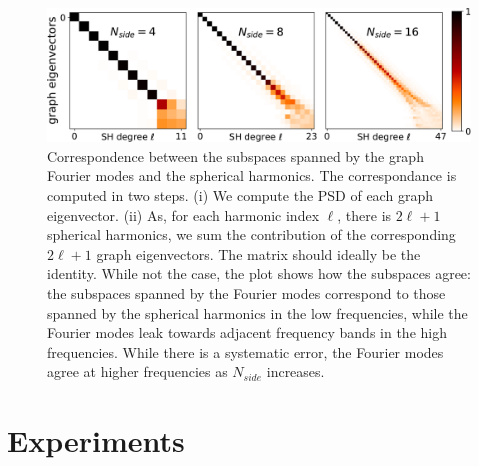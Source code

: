 \documentclass{article} %
\newcommand{\figref}[1]{Figure~\ref{fig:#1}}
\renewcommand{\b}[1]{{\bm{#1}}}   %
\newcommand{\1}{\b{1}}              %
\newcommand{\0}{\b{0}}              %
\newcommand{\todo}[1]{{\color[rgb]{.6,.1,.6}{#1}}}
\begin{document}
\begin{figure}[ht!]
	\centering
	\includegraphics[width=0.9\linewidth]{subspace_harmonics_eigenvectors_v2}
	\caption{Correspondence between the subspaces spanned by the graph Fourier modes and the spherical harmonics.
		The correspondance is computed in two steps. (i) We compute the PSD of each graph eigenvector.
		(ii) As, for each harmonic index $\ell$, there is $2\ell+1$ spherical harmonics, we sum the contribution of the corresponding $2\ell+1$ graph eigenvectors.
		The matrix should ideally be the identity.
		While not the case, the plot shows how the subspaces agree: the subspaces spanned by the Fourier modes correspond to those spanned by the spherical harmonics in the low frequencies, while the Fourier modes leak towards adjacent frequency bands in the high frequencies.
		While there is a systematic error, the Fourier modes agree at higher frequencies as $N_{side}$ increases.}
		\label{fig:subspace_harmonics_eigenvectors}
\end{figure}



\todo{new results from Martino: becomes better in BN setting, currently under study}

\todo{we have less rich operations (compared to the most general linear equivariant map) by restricting our filters to be radial, but does it matter in practice?}
\todo{isotropic filters provide invariance to the third rotation}

\section{Experiments}
\end{document}
